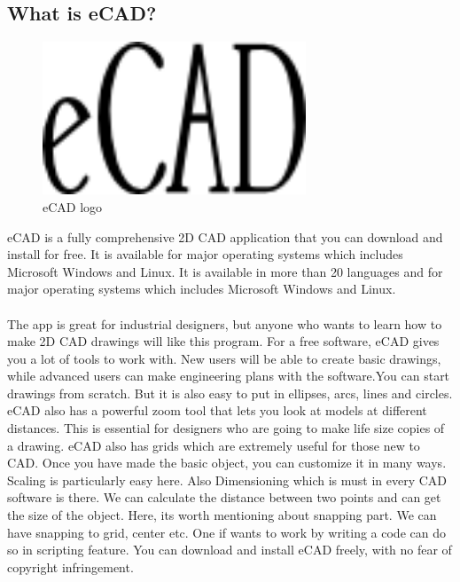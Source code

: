 \subsection{What is eCAD?}
\begin{figure}[h!]
\centering
\includegraphics[width=0.7\textwidth]{images/logo.png}
\caption{eCAD logo}
\end{figure}
eCAD is a fully comprehensive 2D CAD application that you can download and install for free. It is available for major operating systems which includes Microsoft Windows and Linux. It is available in more than 20 languages and for major operating systems which includes Microsoft Windows and Linux.\\\\
The app is great for industrial designers, but anyone who wants to learn how to make 2D
CAD drawings will like this program. For a free software, eCAD gives you a lot of tools
to work with. New users will be able to create basic drawings, while advanced users can
make engineering plans with the software.You can start drawings from scratch. But it is
also easy to put in ellipses, arcs, lines and circles. eCAD also has a powerful zoom tool
that lets you look at models at diﬀerent distances. This is essential for designers who
are going to make life size copies of a drawing. eCAD also has grids which are extremely
useful for those new to CAD. Once you have made the basic object, you can customize
it in many ways. Scaling is particularly easy here. Also Dimensioning which is must in
every CAD software is there. We can calculate the distance between two points and can
get the size of the object. Here, its worth mentioning about snapping part. We can have
snapping to grid, center etc. One if wants to work by writing a code can do so in scripting
feature. You can download and install eCAD freely, with no fear of copyright infringement.\\\\

